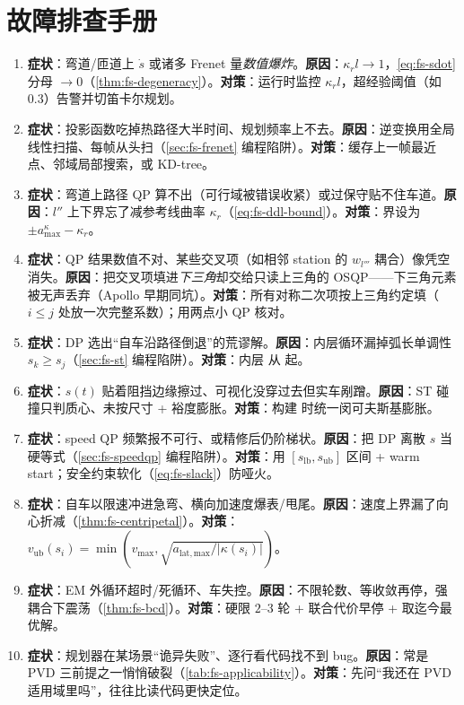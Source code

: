 \section*{故障排查手册}
\begin{enumerate}
  \item \textbf{症状}：弯道/匝道上 $\dot s$ 或诸多 Frenet 量\emph{数值爆炸}。\textbf{原因}：$\kappa_r l\to1$，\cref{eq:fs-sdot} 分母 $\to0$（\cref{thm:fs-degeneracy}）。\textbf{对策}：运行时监控 $\kappa_r l$，超经验阈值（如 $0.3$）告警并切笛卡尔规划。
  \item \textbf{症状}：投影函数吃掉热路径大半时间、规划频率上不去。\textbf{原因}：逆变换用全局线性扫描、每帧从头扫（\cref{sec:fs-frenet} 编程陷阱）。\textbf{对策}：缓存上一帧最近点、邻域局部搜索，或 KD-tree。
  \item \textbf{症状}：弯道上路径 QP 算不出（可行域被错误收紧）或过保守贴不住车道。\textbf{原因}：$l''$ 上下界忘了减参考线曲率 $\kappa_r$（\cref{eq:fs-ddl-bound}）。\textbf{对策}：界设为 $\pm a^\kappa_{\max}-\kappa_r$。
  \item \textbf{症状}：QP 结果数值不对、某些交叉项（如相邻 station 的 $w_{l'''}$ 耦合）像凭空消失。\textbf{原因}：把交叉项填进\emph{下三角}却交给只读上三角的 OSQP\cite{stellato2020osqp}——下三角元素被无声丢弃（Apollo 早期同坑）。\textbf{对策}：所有对称二次项按上三角约定填（$i\le j$ 处放一次完整系数）；用两点小 QP 核对。
  \item \textbf{症状}：DP 选出“自车沿路径倒退”的荒谬解。\textbf{原因}：内层循环漏掉弧长单调性 $s_k\ge s_j$（\cref{sec:fs-st} 编程陷阱）。\textbf{对策}：内层 \verb@sk@ 从 \verb@sj@ 起。
  \item \textbf{症状}：$s(t)$ 贴着阻挡边缘擦过、可视化没穿过去但实车剐蹭。\textbf{原因}：ST 碰撞只判质心、未按尺寸 + 裕度膨胀。\textbf{对策}：构建 \verb@STBoundary@ 时统一闵可夫斯基膨胀。
  \item \textbf{症状}：speed QP 频繁报不可行、或精修后仍阶梯状。\textbf{原因}：把 DP 离散 $s$ 当硬等式（\cref{sec:fs-speedqp} 编程陷阱）。\textbf{对策}：用 $[s_{\mathrm{lb}},s_{\mathrm{ub}}]$ 区间 + warm start；安全约束软化（\cref{eq:fs-slack}）防哑火。
  \item \textbf{症状}：自车以限速冲进急弯、横向加速度爆表/甩尾。\textbf{原因}：速度上界漏了向心折减（\cref{thm:fs-centripetal}）。\textbf{对策}：$v_{\mathrm{ub}}(s_i)=\min(v_{\max},\sqrt{a_{\mathrm{lat,max}}/|\kappa(s_i)|})$。
  \item \textbf{症状}：EM 外循环超时/死循环、车失控。\textbf{原因}：不限轮数、等收敛再停，强耦合下震荡（\cref{thm:fs-bcd}）。\textbf{对策}：硬限 $2$--$3$ 轮 + 联合代价早停 + 取迄今最优解。
  \item \textbf{症状}：规划器在某场景“诡异失败”、逐行看代码找不到 bug。\textbf{原因}：常是 PVD 三前提之一悄悄破裂（\cref{tab:fs-applicability}）。\textbf{对策}：先问“我还在 PVD 适用域里吗”，往往比读代码更快定位。
\end{enumerate}
